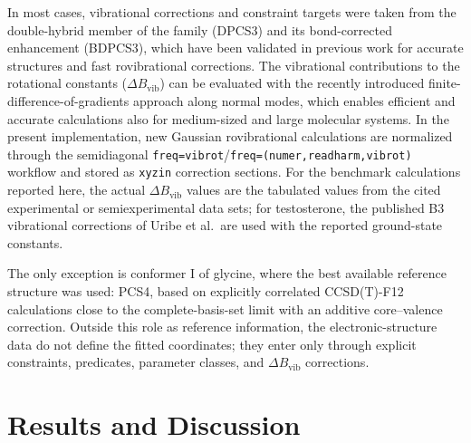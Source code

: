 \documentclass[aip,jcp,reprint,longbibliography,floatfix]{revtex4-2}
\begin{document}
In most cases, vibrational corrections and constraint targets were taken from the
double-hybrid member of the family (DPCS3) and its bond-corrected enhancement (BDPCS3),
which have been validated in previous work for accurate structures and fast rovibrational corrections.\cite{wires_2025,Mendolicchio2025FastDvib,acr_2026}
The vibrational contributions to the rotational constants
($\Delta B_\mathrm{vib}$) can be evaluated with the recently introduced
finite-difference-of-gradients approach along normal modes, which enables
efficient and accurate calculations also for medium-sized and large molecular
systems.\cite{Mendolicchio2025FastDvib} In the present implementation,
new Gaussian rovibrational calculations are normalized through the
semidiagonal \texttt{freq=vibrot}/\texttt{freq=(numer,readharm,vibrot)}
workflow and stored as \texttt{xyzin} correction sections. For the benchmark
calculations reported here, the actual $\Delta B_\mathrm{vib}$ values are the
tabulated values from the cited experimental or semiexperimental data sets;
for testosterone, the published B3 vibrational corrections of
Uribe et al.\ are used with the reported ground-state constants.

The only exception is conformer I of glycine, where the best available reference structure was used: PCS4, based on explicitly correlated CCSD(T)-F12 calculations close to the complete-basis-set limit with an additive core--valence correction. Outside this role as reference information, the electronic-structure
data do not define the fitted coordinates; they enter only through explicit
constraints, predicates, parameter classes, and $\Delta B_\mathrm{vib}$
corrections.


\section{Results and Discussion}
\end{document}
